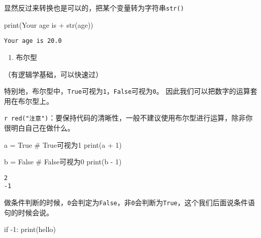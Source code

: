 \documentclass[
  letterpaper,
  DIV=11,
  numbers=noendperiod]{scrreprt}
\newenvironment{Shaded}{\begin{snugshade}}{\end{snugshade}}
\newcommand{\BuiltInTok}[1]{\textcolor[rgb]{0.00,0.23,0.31}{#1}}
\newcommand{\CommentTok}[1]{\textcolor[rgb]{0.37,0.37,0.37}{#1}}
\newcommand{\ControlFlowTok}[1]{\textcolor[rgb]{0.00,0.23,0.31}{#1}}
\newcommand{\DecValTok}[1]{\textcolor[rgb]{0.68,0.00,0.00}{#1}}
\newcommand{\NormalTok}[1]{\textcolor[rgb]{0.00,0.23,0.31}{#1}}
\newcommand{\OperatorTok}[1]{\textcolor[rgb]{0.37,0.37,0.37}{#1}}
\newcommand{\StringTok}[1]{\textcolor[rgb]{0.13,0.47,0.30}{#1}}
\newcommand{\VariableTok}[1]{\textcolor[rgb]{0.07,0.07,0.07}{#1}}
\providecommand{\tightlist}{%
  \setlength{\itemsep}{0pt}\setlength{\parskip}{0pt}}\usepackage{longtable,booktabs,array}
\begin{document}
显然反过来转换也是可以的，把某个变量转为字符串\texttt{str()}

\begin{Shaded}
\begin{Highlighting}[]
\BuiltInTok{print}\NormalTok{(}\StringTok{\textquotesingle{}Your age is \textquotesingle{}} \OperatorTok{+} \BuiltInTok{str}\NormalTok{(age))}
\end{Highlighting}
\end{Shaded}

\begin{verbatim}
Your age is 20.0
\end{verbatim}

\begin{enumerate}
\def\labelenumi{\arabic{enumi}.}
\setcounter{enumi}{1}
\tightlist
\item
  布尔型
\end{enumerate}

（有逻辑学基础，可以快速过）

特别地，布尔型中，\texttt{True}可视为\texttt{1}，\texttt{False}可视为\texttt{0}。
因此我们可以把数字的运算套用在布尔型上。

\texttt{r\ red("注意")}：要保持代码的清晰性，一般不建议使用布尔型进行运算，除非你很明白自己在做什么。

\begin{Shaded}
\begin{Highlighting}[]
\NormalTok{a }\OperatorTok{=} \VariableTok{True} \CommentTok{\# True可视为1}
\BuiltInTok{print}\NormalTok{(a }\OperatorTok{+} \DecValTok{1}\NormalTok{)}

\NormalTok{b }\OperatorTok{=} \VariableTok{False} \CommentTok{\# False可视为0}
\BuiltInTok{print}\NormalTok{(b }\OperatorTok{{-}} \DecValTok{1}\NormalTok{)}
\end{Highlighting}
\end{Shaded}

\begin{verbatim}
2
-1
\end{verbatim}

做条件判断的时候，\texttt{0}会判定为\texttt{False}，非\texttt{0}会判断为\texttt{True}，这个我们后面说条件语句的时候会说。

\begin{Shaded}
\begin{Highlighting}[]
\ControlFlowTok{if} \OperatorTok{{-}}\DecValTok{1}\NormalTok{:}
  \BuiltInTok{print}\NormalTok{(}\StringTok{\textquotesingle{}hello\textquotesingle{}}\NormalTok{)}
\end{Highlighting}
\end{Shaded}
\end{document}
